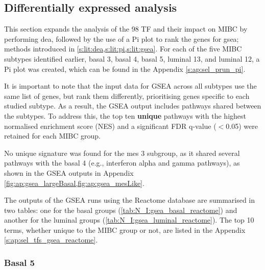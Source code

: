 \subsection{Differentially expressed analysis} \label{s:N_I:sel_tfs_subtypes}

This section expands the analysis of the 98 TF and their impact on MIBC by performing \acrlong{dea}, followed by the use of a Pi plot to rank the genes for \acrfull{gsea}; methods introduced in \cref{s:lit:dea,s:lit:pi,s:lit:gsea}. For each of the five MIBC subtypes identified earlier, basal 3, basal 4, basal 5, luminal 13, and luminal 12, a Pi plot was created, which can be found in the Appendix \cref{s:ap:sel_prun_pi}. 

It is important to note that the input data for GSEA across all subtypes use the same list of genes, but rank them differently, prioritising genes specific to each studied subtype. As a result, the GSEA output includes pathways shared between the subtypes. To address this, the top ten \textbf{unique} pathways with the highest normalised enrichment score (NES) and a significant FDR q-value ($<$0.05) were retained for each MIBC group.

No unique signature was found for the mes 3 subgroup, as it shared several pathways with the basal 4 (e.g., interferon alpha and gamma pathways), as shown in the GSEA outputs in Appendix \cref{fig:ap:gsea_largeBasal,fig:ap:gsea_mesLike}.

The outputs of the GSEA runs using the Reactome database are summarised in two tables: one for the basal groups (\cref{tab:N_I:gsea_basal_reactome}) and another for the luminal groups (\cref{tab:N_I:gsea_luminal_reactome}). The top 10 terms, whether unique to the MIBC group or not, are listed in the Appendix \cref{s:ap:sel_tfs_gsea_reactome}.


\subsubsection*{Basal 5}


